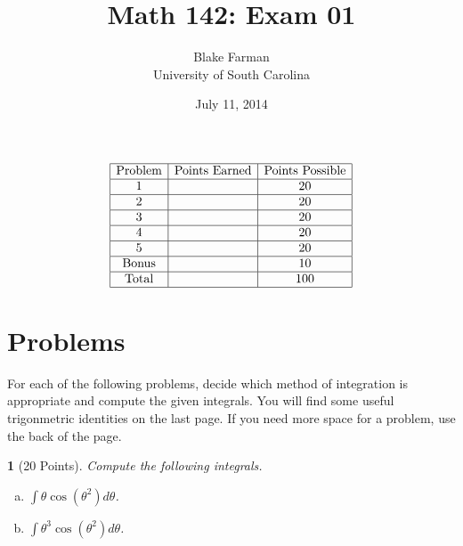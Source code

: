 \documentclass[12pt]{amsart}
\author{Blake Farman\\University of South Carolina}
\title{Math 142: Exam 01}
\date{July 11, 2014}
\begin{document}
\maketitle

\begin{center}
\end{center}

\vspace{0.2in}
\vspace{0.2in}

\theoremstyle{plain}
\newtheorem{thm}{}
\newtheorem{lem}{Lemma}
\theoremstyle{definition}
\newtheorem{defn}{Definition}

$$
\begin{array}{|c|c|c|}
  \hline
  \text{Problem} & \text{Points Earned} & \text{Points Possible}\\
  \hline
  1 & & 20\\
  \hline
  2 & & 20\\
  \hline
  3 & & 20\\
  \hline
  4 & & 20\\
  \hline
  5 & & 20 \\
  \hline
  \text{Bonus} & & 10\\
  \hline
  \text{Total} & & 100\\
  \hline
\end{array}
$$

\newpage

\section{Problems}

For each of the following problems, decide which method of integration is appropriate and compute the given integrals.
You will find some useful trigonmetric identities on the last page.
If you need more space for a problem, use the back of the page.

\begin{thm}[20 Points]
  Compute the following integrals.
  \begin{enumerate}[(a)]
  \item\label{1.a}
    $\displaystyle{\int \theta\cos(\theta^2)d\theta}$.
    \vspace{3in}
  \item
    $\displaystyle{\int \theta^3\cos(\theta^2)d\theta}$.
  \end{enumerate}
\end{thm}
\end{document}
